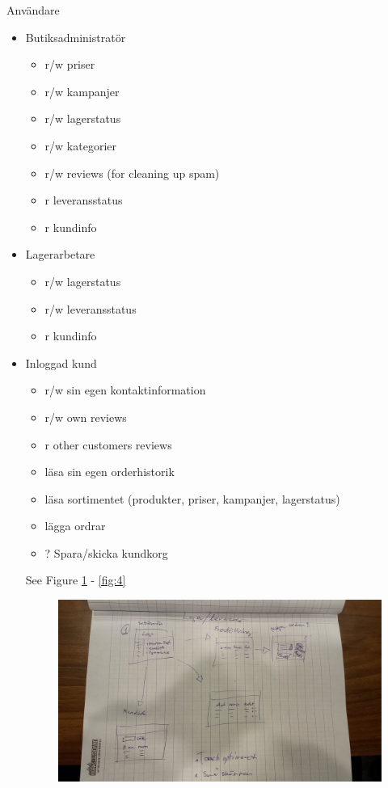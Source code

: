 \documentclass[paper=a4, fontsize=11pt]{report} %
\begin{document}
Användare
\begin{itemize}
	\item Butiksadministratör
		\begin{itemize}
			\item r/w priser
			\item r/w kampanjer
			\item r/w lagerstatus
			\item r/w kategorier
			\item r/w reviews (for cleaning up spam)
			\item r leveransstatus
			\item r kundinfo
		\end{itemize}
	\item Lagerarbetare
		\begin{itemize}
			\item r/w lagerstatus
			\item r/w leveransstatus
			\item r kundinfo
		\end{itemize}
	\item Inloggad kund
		\begin{itemize}
			\item r/w sin egen kontaktinformation
			\item r/w own reviews
			\item r other customers reviews
			\item läsa sin egen orderhistorik
			\item läsa sortimentet (produkter, priser, kampanjer, lagerstatus)
			\item lägga ordrar
			\item ? Spara/skicka kundkorg
		\end{itemize}

	See Figure \ref{fig:2} - \ref{fig:4}

	\begin{figure}
		\includegraphics[scale=0.12]{artifacts/Lager.jpeg}
		\caption{}
		\label{fig:2}
	\end{figure}


\end{itemize}
\end{document}

